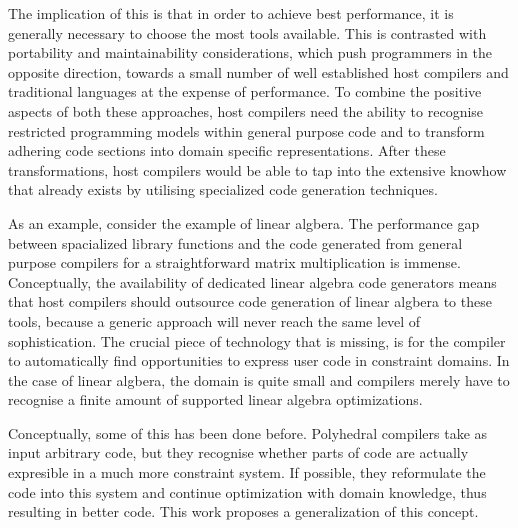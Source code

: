     The implication of this is that in order to achieve best performance, it is
    generally necessary to choose the most tools available.
    This is contrasted with portability and maintainability considerations,
    which push programmers in the opposite direction, towards a small number of
    well established host compilers and traditional languages at the expense of
    performance.
    To combine the positive aspects of both these approaches, host compilers
    need the ability to recognise restricted programming models within general
    purpose code and to transform adhering code sections into domain specific
    representations.
    After these transformations, host compilers would be able to tap into the
    extensive knowhow that already exists by utilising specialized code
    generation techniques.

    As an example, consider the example of linear algbera.
    The performance gap between spacialized library functions and the code
    generated from general purpose compilers for a straightforward matrix
    multiplication is immense.
    Conceptually, the availability of dedicated linear algebra code generators
    means that host compilers should outsource code generation of linear algbera
    to these tools, because a generic approach will never reach the same level
    of sophistication.
    The crucial piece of technology that is missing, is for the compiler to
    automatically find opportunities to express user code in constraint
    domains.
    In the case of linear algbera, the domain is quite small and compilers
    merely have to recognise a finite amount of supported linear algebra
    optimizations.

    Conceptually, some of this has been done before.
    Polyhedral compilers take as input arbitrary code, but they recognise whether
    parts of code are actually expresible in a much more constraint system.
    If possible, they reformulate the code into this system and continue
    optimization with domain knowledge, thus resulting in better code.
    This work proposes a generalization of this concept.



